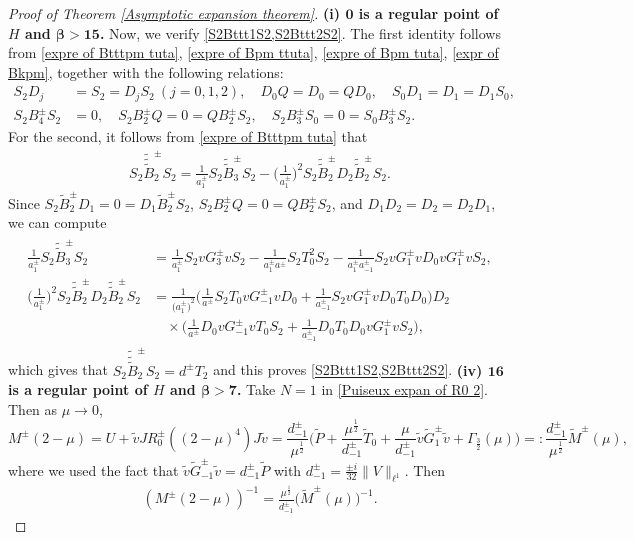 \documentclass[reqno, 11pt]{amsart}
\numberwithin{equation}{section}
\begin{document}
\begin{proof}[Proof of Theorem {\rm\ref{Asymptotic expansion theorem}}]{\bf{(i) ${\bm{0}}$ is a regular point of $H$ and {$\bm{\beta>15}$}.}}
Now, we verify \eqref{S2Bttt1S2,S2Bttt2S2}. The first identity follows from \eqref{expre of Btttpm tuta}, \eqref{expre of Bpm ttuta}, \eqref{expre of Bpm tuta}, \eqref{expr of Bkpm}, together with the following relations:
\begin{align*}
S_2D_j&=S_2=D_jS_2~(j=0,1,2),\quad D_0Q=D_0=QD_0,\quad  S_0D_1=D_1=D_1S_0,\\
S_2B^{\pm}_4S_2&=0,\quad S_2B^{\pm}_2Q=0=QB^{\pm}_2S_2,\quad S_2B^{\pm}_3S_0=0=S_0B^{\pm}_3S_2.
\end{align*}
For the second, it follows from \eqref{expre of Btttpm tuta} that 
\begin{align*}
S_2\tilde{\tilde{\tilde{B}}}^{\pm}_{2}S_2=\frac{1}{a^{\pm}_1}S_2\tilde{\tilde{B}}^{\pm}_3S_2-\Big(\frac{1}{a^{\pm}_{1}}\Big)^2S_2\tilde{\tilde{B}}^{\pm}_2D_2\tilde{\tilde{B}}^{\pm}_2S_2.
\end{align*}
Since $S_2\widetilde{B}^{\pm}_2D_1=0=D_1\widetilde{B}^{\pm}_2S_2$, $S_2B^{\pm}_2Q=0=QB^{\pm}_2S_2$, and $D_1D_2=D_2=D_2D_1$, we can compute
\begin{align}
\begin{split}
\frac{1}{a^{\pm}_1}S_2\tilde{\tilde{B}}^{\pm}_3S_2&=\frac{1}{a^{\pm}_1}S_2vG^{\pm}_3vS_2-\frac{1}{a^{\pm}_1a^{\pm}}S_2T^2_0S_2-\frac{1}{a^{\pm}_1a^{\pm}_{-1}}S_2vG^{\pm}_1vD_0vG^{\pm}_1vS_2,\\
\Big(\frac{1}{a^{\pm}_{1}}\Big)^2S_2\tilde{\tilde{B}}^{\pm}_2D_2\tilde{\tilde{B}}^{\pm}_2S_2&=\frac{1}{{\big(a^{\pm}_1\big)}^2}\Big(\frac{1}{a^{\pm}}S_2T_0vG^{\pm}_{-1}vD_0+\frac{1}{a^{\pm}_{-1}}S_2vG^{\pm}_1vD_0T_0D_0\Big)D_2\\
&\quad\times\Big(\frac{1}{a^{\pm}}D_0vG^{\pm}_{-1}vT_0S_2+\frac{1}{a^{\pm}_{-1}}D_0T_0D_0vG^{\pm}_1vS_2\Big),
\end{split}
\end{align}
which gives that $S_2\tilde{\tilde{\tilde{B}}}^{\pm}_{2}S_2=d^{\pm}T_2$ and this proves \eqref{S2Bttt1S2,S2Bttt2S2}.
\vskip0.2cm
{\bf{(iv) ${\bm{16}}$ is a regular point of $H$ and {$\bm{\beta>7}$}.}} Take $N=1$ in \eqref{Puiseux expan of R0 2}. Then as $\mu\rightarrow0$,
\begin{equation*}
M^{\pm}(2-\mu)=U+\tilde{v}JR^{\pm}_0((2-\mu)^4)J\tilde{v}
=\frac{d^{\pm}_{-1}}{\mu^{\frac{1}{2}}}\Big(\widetilde{P}+\frac{\mu^{\frac{1}{2}}}{d^{\pm}_{-1}}\widetilde{T}_0+\frac{\mu}{d^{\pm}_{-1}}\tilde{v}\widetilde{G}^{\pm}_{1}\tilde{v}+\Gamma_{\frac{3}{2}}(\mu)\Big)=:\frac{d^{\pm}_{-1}}{\mu^{\frac{1}{2}}}\widetilde{M}^{\pm}(\mu),
\end{equation*}
where we used the fact that $\tilde{v}\widetilde{G}^{\pm}_{-1}\tilde{v}=d^{\pm}_{-1}\widetilde{P}$ with $d^{\pm}_{-1}=\frac{\pm i}{32}\|V\|_{\ell^1}$. Then
\begin{align}\label{Relat of M and M tuta at 2} \left(M^{\pm}(2-\mu)\right)^{-1}=\frac{\mu^{\frac{1}{2}}}{d^{\pm}_{-1}}\big(\widetilde{M}^{\pm}(\mu)\big)^{-1}.
\end{align}


\end{proof}
\end{document}
